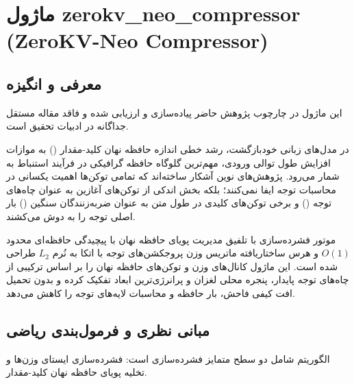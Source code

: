 \section{ماژول zerokv\_neo\_compressor (ZeroKV-Neo Compressor)}
\label{sec:module_zerokv_neo_compressor}

\subsection{معرفی و انگیزه}
این ماژول در چارچوب پژوهش حاضر پیاده‌سازی و ارزیابی شده و فاقد مقاله مستقل جداگانه در ادبیات تحقیق است.

در مدل‌های زبانی خودبازگشت، رشد خطی اندازه حافظه نهان کلید-مقدار () به موازات افزایش طول توالی ورودی، مهم‌ترین گلوگاه حافظه گرافیکی در فرآیند استنباط به شمار می‌رود. پژوهش‌های نوین آشکار ساخته‌اند که تمامی توکن‌ها اهمیت یکسانی در محاسبات توجه ایفا نمی‌کنند؛ بلکه بخش اندکی از توکن‌های آغازین به عنوان چاه‌های توجه () و برخی توکن‌های کلیدی در طول متن به عنوان ضربه‌زنندگان سنگین () بار اصلی توجه را به دوش می‌کشند.

موتور فشرده‌سازی  با تلفیق مدیریت پویای حافظه نهان با پیچیدگی حافظه‌ای محدود $O(1)$ و هرس ساختاریافته ماتریس وزن پروجکشن‌های توجه با اتکا به نُرم $L_2$ طراحی شده است. این ماژول کانال‌های وزن و توکن‌های حافظه نهان را بر اساس ترکیبی از چاه‌های توجه پایدار، پنجره محلی لغزان و پرانرژی‌ترین ابعاد تفکیک کرده و بدون تحمیل افت کیفی فاحش، بار حافظه و محاسبات لایه‌های توجه را کاهش می‌دهد.

\subsection{مبانی نظری و فرمول‌بندی ریاضی}
الگوریتم  شامل دو سطح متمایز فشرده‌سازی است: فشرده‌سازی ایستای وزن‌ها و تخلیه پویای حافظه نهان کلید-مقدار.

